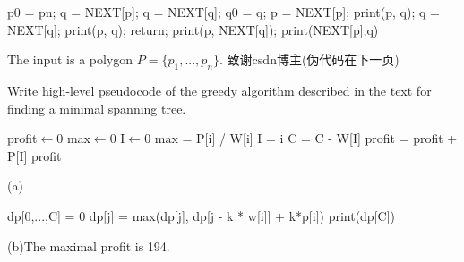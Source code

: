 \documentclass[a4paper, justified]{tufte-handout}
\begin{document}
\begin{solution}
  \noindent
  \begin{algorithm}
    \begin{algorithmic}[1]
      \State p0 = pn;
      \State q = NEXT[p];
      \State q = NEXT[q];
      \State q0 = q;
      \State p = NEXT[p];
      \State print(p, q);
      \State q = NEXT[q];
      \State print(p, q);
      \Else return;
      \EndIf
      \EndWhile
      \State {}
      \State print(p, NEXT[q]);
      \Else print(NEXT[p],q)
      \EndIf
      \EndIf
      \EndWhile
      \EndWhile
      \EndProcedure
    \end{algorithmic}
  \end{algorithm}
  The input is a polygon $P = \{p_1,...,p_n\}$.
  致谢csdn博主(伪代码在下一页)
\end{solution}

\begin{problem}[DH 4-12]
Write high-level pseudocode of the greedy algorithm described in the text
for finding a minimal spanning tree.
\end{problem}

\begin{solution}
  \noindent
  \begin{algorithm}
    \begin{algorithmic}[2]
      \State profit$\gets$0
      \State max$\gets$0
      \State I$\gets$0
      \State max = P[i] / W[i]
      \State I = i
      \EndIf
      \EndFor
      \State C = C - W[I]
      \State profit = profit + P[I]
      \EndWhile
      \State \Return profit
      \EndProcedure
    \end{algorithmic}
  \end{algorithm}
\end{solution}

\begin{problem}[DH 4-13]
\end{problem}

\begin{solution}
  (a)\\
  \noindent
  \begin{algorithm}
    \begin{algorithmic}[1]
      \State dp[0,...,C] = 0
      \State dp[j] = max(dp[j], dp[j - k * w[i]] + k*p[i])
      \EndFor
      \EndFor
      \EndFor
      \State print(dp[C])
      \EndProcedure
    \end{algorithmic}
  \end{algorithm}
  (b)The maximal profit is 194.
\end{solution}
\end{document}
